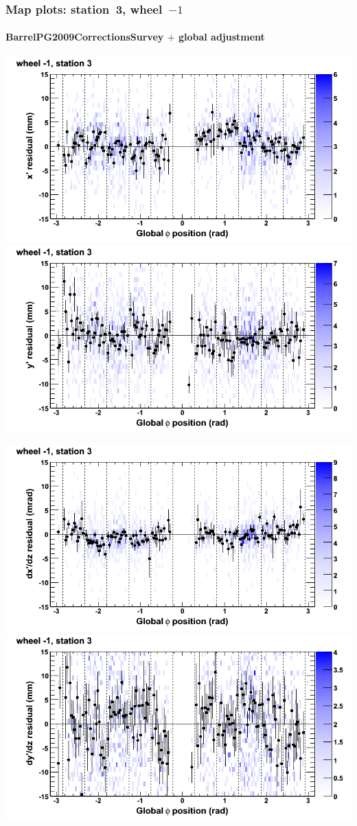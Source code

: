 \documentclass[compress]{beamer}
\begin{document}
\begin{frame}
\frametitle{Map plots: station~3, wheel~$-1$}
\framesubtitle{BarrelPG2009CorrectionsSurvey $+$ global adjustment}
\includegraphics[width=0.5\linewidth]{mapplots_re01/DTvsphi_st3whB_x.png}
\includegraphics[width=0.5\linewidth]{mapplots_re01/DTvsphi_st3whB_y.png}

\includegraphics[width=0.5\linewidth]{mapplots_re01/DTvsphi_st3whB_dxdz.png}
\includegraphics[width=0.5\linewidth]{mapplots_re01/DTvsphi_st3whB_dydz.png}
\end{frame}
\end{document}
